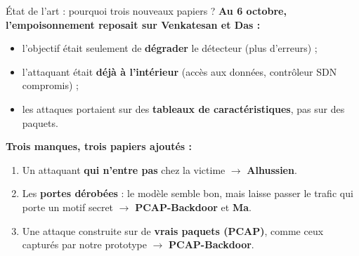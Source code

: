 \documentclass[aspectratio=169,11pt,xcolor=table]{beamer}
\newcommand{\espacement}{\setlength{\itemsep}{.8em}}
\begin{document}
\begin{frame}{État de l'art : pourquoi trois nouveaux papiers ?}
  \textbf{Au 6 octobre, l'empoisonnement reposait sur Venkatesan et Das :}
  \begin{itemize}
    \item l'objectif était seulement de \textbf{dégrader} le détecteur (plus d'erreurs) ;
    \item l'attaquant était \textbf{déjà à l'intérieur} (accès aux données, contrôleur SDN compromis) ;
    \item les attaques portaient sur des \textbf{tableaux de caractéristiques}, pas sur des paquets.
  \end{itemize}
  \vspace{.6em}
  \textbf{Trois manques, trois papiers ajoutés :}
  \begin{enumerate}\espacement
    \item Un attaquant \textbf{qui n'entre pas} chez la victime $\rightarrow$ \textbf{Alhussien}.
    \item Les \textbf{portes dérobées} : le modèle semble bon, mais laisse passer le trafic qui porte un motif secret $\rightarrow$ \textbf{PCAP-Backdoor} et \textbf{Ma}.
    \item Une attaque construite sur de \textbf{vrais paquets (PCAP)}, comme ceux capturés par notre prototype $\rightarrow$ \textbf{PCAP-Backdoor}.
  \end{enumerate}
\end{frame}
\end{document}
